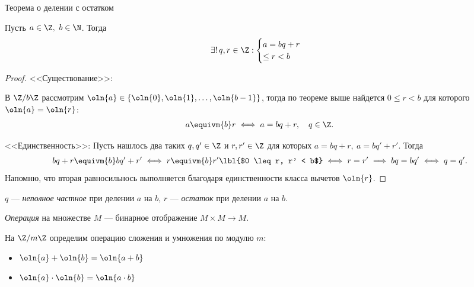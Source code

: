 \begin{follow}
    Теорема о делении с остатком
    
    Пусть $a \in \Z,~b \in \N$. Тогда 
    \begin{gather*}
        \exists!\,q, r \in \Z : \begin{cases}a = bq + r \\ \leq r < b\end{cases}
    \end{gather*}
\end{follow}

\begin{proof}

    <<Существование>>:

    В $\Z/b\Z$ рассмотрим $\oln{a} \in \{\oln{0}, \oln{1}, \ldots, \oln{b-1}\}$, тогда по теореме выше найдется $0 \leq r < b$ для которого $\oln{a} = \oln{r}$:
    \begin{gather*}
        a \equivm{b} r \iff a = bq + r, \quad q \in \Z.
    \end{gather*}

    <<Единственность>>:
    Пусть нашлось два таких $q, q' \in \Z$ и $r, r' \in \Z$ для которых $a = bq + r,~ a = bq' + r'$. Тогда
    \begin{gather*}
        bq+r \equivm{b} bq'+r' \iff r \equivm{b} r' \lbl{$0 \leq r, r' < b$}\iff r = r' \implies bq = bq' \iff q = q'.
    \end{gather*}
    Напомню, что вторая равносильнось выполняется благодаря единственности класса вычетов $\oln{r}$.
\end{proof}

\begin{defn}
    $q$ --- \emph{неполное частное} при делении $a$ на $b$, $r$ --- \emph{остаток} при делении $a$ на $b$.
\end{defn}

\begin{defn}
    \emph{Операция} на множестве $M$ --- бинарное отображение $M \times M \to M$.
\end{defn}

На $\Z/m\Z$ определим операцию сложения и умножения по модулю $m$:

\begin{itemize}
    \item $\oln{a} + \oln{b} = \oln{a + b}$
    
    \item $\oln{a} \cdot \oln{b} = \oln{a \cdot b}$
\end{itemize}

